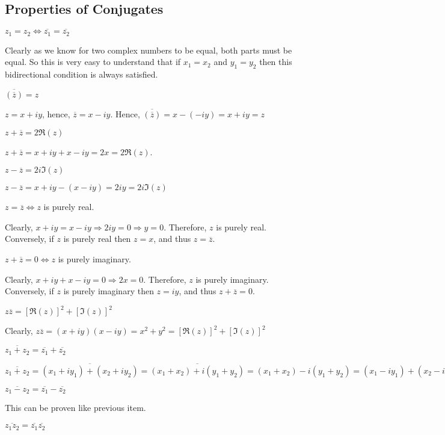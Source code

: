 \subsection{Properties of Conjugates}
\startitemize[n]
\item $z_1 = z_2 \Leftrightarrow \overline{z_1} = \overline{z_2}$

  Clearly as we know for two complex numbers to be equal, both parts must be equal. So this is very easy to understand that if $x_1
  = x_2$ and $y_1 = y_2$ then this bidirectional condition is always satisfied.
\item $\overline{\left(\overline{z}\right)} = z$

  $z = x + iy$, hence, $\overline{z} = x - iy$. Hence, $\overline{\left(\overline{z}\right)} = x - (-iy) = x + iy = z$
\item $z + \overline{z} = 2\Re(z)$

  $z + \overline{z} = x + iy + x - iy = 2x = 2\Re(z)$.
\item $z - \overline{z} = 2i\Im(z)$

  $z - \overline{z} = x + iy - (x - iy) = 2iy = 2i\Im(z)$
\item $z = \overline{z} \Leftrightarrow z$ is purely real.

  Clearly, $x + iy = x - iy \Rightarrow 2iy = 0 \Rightarrow y = 0$. Therefore, $z$ is purely real. Conversely, if $z$ is purely
  real then $z = x$, and thus $z = \overline{z}$.
\item $z + \overline{z} = 0 \Leftrightarrow z$ is purely imaginary.

  Clearly, $x + iy + x - iy = 0 \Rightarrow 2x = 0$. Therefore, $z$ is purely imaginary. Conversely, if $z$ is purely imaginary
  then $z = iy$, and thus $z + \overline{z} = 0$.
\item $z\overline{z} = [\Re(z)]^2 + [\Im(z)]^2$

  Clearly, $z\overline{z} = (x + iy)(x - iy) = x^2 + y^2 = [\Re(z)]^2 + [\Im(z)]^2$
\item $\overline{z_1 + z_2} = \overline{z_1} + \overline{z_2}$

  $\overline{z_1 + z_2} = \overline{(x_1 + iy_1) + (x_2 + iy_2)} = \overline{(x_1 + x_2) + i(y_1 + y_2)} = (x_1 + x_2) - i(y_1 +
  y_2) = (x_1 - iy_1) + (x_2 - iy_2) = \overline{z_1} + \overline{z_2}$
\item $\overline{z_1 - z_2} = \overline{z_1} - \overline{z_2}$

  This can be proven like previous item.
\item $\overline{z_1z_2} = \overline{z_1}\overline{z_2}$

